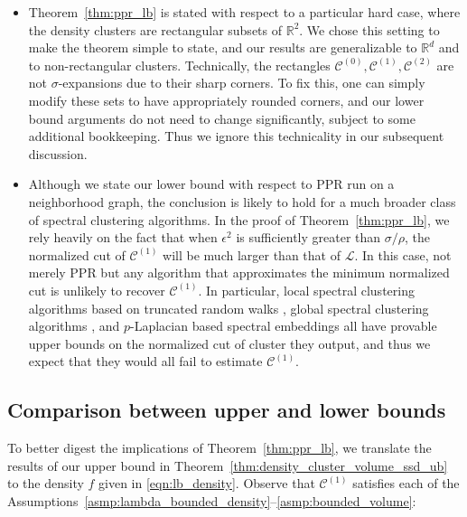 \documentclass[11pt,twoside]{article}
\newcommand{\Reals}{\mathbb{R}}
\newcommand{\1}{\mathbf{1}}
\newcommand{\mc}[1]{\mathcal{#1}}
\begin{document}
\begin{itemize}
	\item Theorem~\ref{thm:ppr_lb} is stated with respect to a particular hard case, where the density clusters are rectangular subsets of $\Reals^2$.  We chose this
	setting to make the theorem simple to state, and our results are generalizable
	to $\Reals^d$ and to non-rectangular clusters. Technically, the rectangles $\mc{C}^{(0)},\mc{C}^{(1)},\mc{C}^{(2)}$ are not
	$\sigma$-expansions due to their sharp corners. To fix this, one can   
	simply modify these sets to have appropriately rounded corners, and our lower
	bound arguments do not need to change significantly, subject to some
	additional bookkeeping.  Thus we ignore this technicality in our subsequent
	discussion. 
	
	\item Although we state our lower bound with respect to PPR run on a neighborhood graph, the conclusion is likely to hold for a much broader class of spectral clustering algorithms. In the proof of Theorem~\ref{thm:ppr_lb}, we rely heavily on the fact that when $\epsilon^2$ is sufficiently greater than $\sigma/\rho$, the normalized cut of $\mc{C}^{(1)}$ will be much larger than that of $\mathcal{L}$. In this case, not merely PPR but any algorithm that approximates the minimum normalized cut is unlikely to recover $\mc{C}^{(1)}$. In particular, local spectral clustering
	algorithms based on truncated random walks \citep{spielman2013}, global spectral
	clustering algorithms \citep{shi00}, and $p$-Laplacian based spectral embeddings
	\citep{hein2010} all have provable upper bounds on the normalized cut of cluster
	they output, and thus we expect that they would all fail to estimate $\mc{C}^{(1)}$.
\end{itemize}

\subsection{Comparison between upper and lower bounds}
\label{subsec:comparison_upper_lower_bounds}

To better digest the implications of Theorem~\ref{thm:ppr_lb}, we translate the
results of our upper bound in Theorem~\ref{thm:density_cluster_volume_ssd_ub} to the density $f$ given in \eqref{eqn:lb_density}. Observe that $\mc{C}^{(1)}$ satisfies each of the Assumptions~\ref{asmp:lambda_bounded_density}--\ref{asmp:bounded_volume}:
\end{document}
